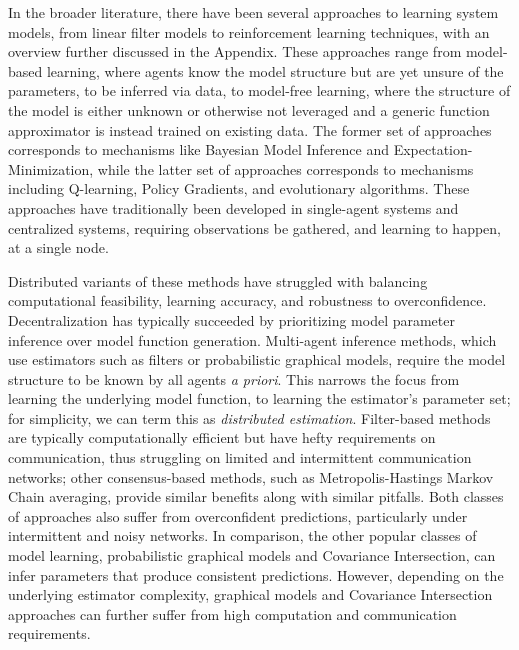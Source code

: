 In the broader literature, there have been several approaches to learning system models, from linear filter models to reinforcement learning techniques, with an overview further discussed in the Appendix. These approaches range from model-based learning, where agents know the model structure but are yet unsure of the parameters, to be inferred via data, to model-free learning, where the structure of the model is either unknown or otherwise not leveraged and a generic function approximator is instead trained on existing data. The former set of approaches corresponds to mechanisms like Bayesian Model Inference and Expectation-Minimization, while the latter set of approaches corresponds to mechanisms including Q-learning, Policy Gradients, and evolutionary algorithms. These approaches have traditionally been developed in single-agent systems and centralized systems, requiring observations be gathered, and learning to happen, at a single node.

Distributed variants of these methods have struggled with balancing computational feasibility, learning accuracy, and robustness to overconfidence. Decentralization has typically succeeded by prioritizing model parameter inference over model function generation. Multi-agent inference methods, which use estimators such as filters or probabilistic graphical models, require the model structure to be known by all agents \textit{a priori}. This narrows the focus from learning the underlying model function, to learning the estimator's parameter set; for simplicity, we can term this as \textit{distributed estimation}. Filter-based methods are typically computationally efficient but have hefty requirements on communication, thus struggling on limited and intermittent communication networks; other consensus-based methods, such as Metropolis-Hastings Markov Chain averaging, provide similar benefits along with similar pitfalls. Both classes of approaches also suffer from overconfident predictions, particularly under intermittent and noisy networks. In comparison, the other popular classes of model learning, probabilistic graphical models and Covariance Intersection, can infer parameters that produce consistent predictions. However, depending on the underlying estimator complexity, graphical models and Covariance Intersection approaches can further suffer from high computation and communication requirements.

